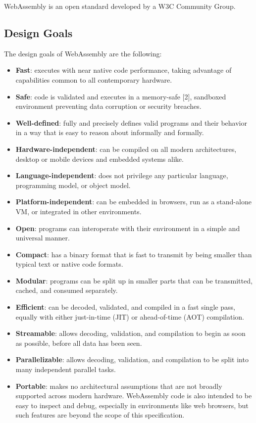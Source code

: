 WebAssembly is an open standard developed by a W3C Community Group.

\subsection{Design Goals} \mbox{}

\indent The design goals of WebAssembly are the following:

\begin{itemize} 
  \item \textbf{Fast}: executes with near native code performance, taking advantage of capabilities common to all contemporary hardware.
  \item \textbf{Safe}: code is validated and executes in a memory-safe [2], sandboxed environment preventing data corruption or security breaches.
  \item \textbf{Well-defined}: fully and precisely defines valid programs and their behavior in a way that is easy to reason about informally and formally.
  \item \textbf{Hardware-independent}: can be compiled on all modern architectures, desktop or mobile devices and embedded systems alike.
  \item \textbf{Language-independent}: does not privilege any particular language, programming model, or object model.
  \item \textbf{Platform-independent}: can be embedded in browsers, run as a stand-alone VM, or integrated in other environments.
  \item \textbf{Open}: programs can interoperate with their environment in a simple and universal manner.
  \item \textbf{Compact}: has a binary format that is fast to transmit by being smaller than typical text or native code formats.
  \item \textbf{Modular}: programs can be split up in smaller parts that can be transmitted, cached, and consumed separately.
  \item \textbf{Efficient}: can be decoded, validated, and compiled in a fast single pass, equally with either just-in-time (JIT) or ahead-of-time (AOT) compilation.
  \item \textbf{Streamable}: allows decoding, validation, and compilation to begin as soon as possible, before all data has been seen.
  \item \textbf{Parallelizable}: allows decoding, validation, and compilation to be split into many independent parallel tasks.
  \item \textbf{Portable}: makes no architectural assumptions that are not broadly supported across modern hardware. WebAssembly code is also intended to be easy to inspect and debug, especially in environments like web browsers, but such features are beyond the scope of this specification.
\end{itemize}

